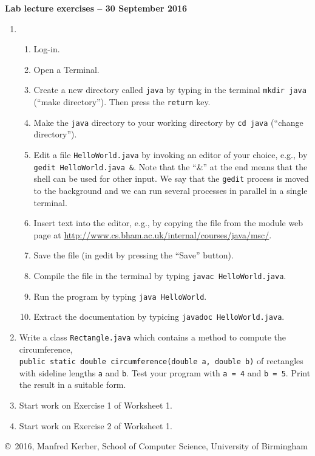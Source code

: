 \documentclass[12pt]{article}
\def\myfooter{\vfill{\footnotesize\noindent\copyright\ 2016, Manfred Kerber, School of Computer Science, University of Birmingham}}
\newcommand{\myhead}[1]{\begin{center}\large\bf #1\end{center}}
\begin{document}
\myhead{Lab lecture exercises -- 30 September 2016}
\begin{enumerate}
 \item
   \begin{enumerate}
     \item Log-in.
     \item Open a Terminal.
     \item Create a new directory called \texttt{java} by typing in the terminal \texttt{mkdir java} (``make directory''). Then press the \texttt{return} key.
     \item Make the \texttt{java} directory to your working directory by \texttt{cd java} (``change directory'').
     \item Edit a file \texttt{HelloWorld.java} by invoking an editor
       of your choice, e.g., by \texttt{gedit HelloWorld.java
         \&}. Note that the ``\&'' at the end means that the shell can
       be used for other input. We say that the \texttt{gedit} process
       is moved to the background and we can run several processes in
       parallel in a single terminal.
     \item Insert text into the editor, e.g., by copying the file from the module web page at
       \url{http://www.cs.bham.ac.uk/internal/courses/java/msc/}.
     \item Save the file (in gedit by pressing the ``Save'' button).
     \item Compile the file in the terminal by typing \texttt{javac HelloWorld.java}.
     \item Run the program by typing \texttt{java HelloWorld}.
     \item Extract the documentation by typicing \texttt{javadoc HelloWorld.java}.
    \end{enumerate}

  \item Write a class \texttt{Rectangle.java} which contains a method
    to compute the circumference,\\ \texttt{public
      static double circumference(double a, double b)} of
    rectangles with sideline lengths \texttt{a} and \texttt{b}. Test
    your program with \texttt{a = 4} and \texttt{b = 5}. Print the
    result in a suitable form.

    \item Start work on Exercise 1 of Worksheet 1.
    \item Start work on Exercise 2 of Worksheet 1.
\end{enumerate}

\myfooter
\end{document}
